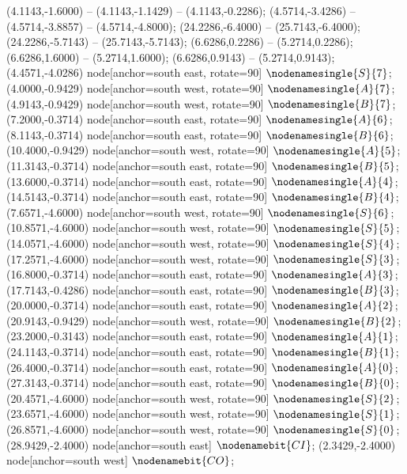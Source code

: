    (4.1143,-1.6000) -- (4.1143,-1.1429) -- (4.1143,-0.2286);
   (4.5714,-3.4286) -- (4.5714,-3.8857) -- (4.5714,-4.8000);
   (24.2286,-6.4000) -- (25.7143,-6.4000);
   (24.2286,-5.7143) -- (25.7143,-5.7143);
   (6.6286,0.2286) -- (5.2714,0.2286);
   (6.6286,1.6000) -- (5.2714,1.6000);
   (6.6286,0.9143) -- (5.2714,0.9143);
   (4.4571,-4.0286) node[anchor=south east, rotate=90] {$\nodenamesingle{S}{7}$};
   (4.0000,-0.9429) node[anchor=south west, rotate=90] {$\nodenamesingle{A}{7}$};
   (4.9143,-0.9429) node[anchor=south west, rotate=90] {$\nodenamesingle{B}{7}$};
   (7.2000,-0.3714) node[anchor=south east, rotate=90] {$\nodenamesingle{A}{6}$};
   (8.1143,-0.3714) node[anchor=south east, rotate=90] {$\nodenamesingle{B}{6}$};
   (10.4000,-0.9429) node[anchor=south west, rotate=90] {$\nodenamesingle{A}{5}$};
   (11.3143,-0.3714) node[anchor=south east, rotate=90] {$\nodenamesingle{B}{5}$};
   (13.6000,-0.3714) node[anchor=south east, rotate=90] {$\nodenamesingle{A}{4}$};
   (14.5143,-0.3714) node[anchor=south east, rotate=90] {$\nodenamesingle{B}{4}$};
   (7.6571,-4.6000) node[anchor=south west, rotate=90] {$\nodenamesingle{S}{6}$};
   (10.8571,-4.6000) node[anchor=south west, rotate=90] {$\nodenamesingle{S}{5}$};
   (14.0571,-4.6000) node[anchor=south west, rotate=90] {$\nodenamesingle{S}{4}$};
   (17.2571,-4.6000) node[anchor=south west, rotate=90] {$\nodenamesingle{S}{3}$};
   (16.8000,-0.3714) node[anchor=south east, rotate=90] {$\nodenamesingle{A}{3}$};
   (17.7143,-0.4286) node[anchor=south east, rotate=90] {$\nodenamesingle{B}{3}$};
   (20.0000,-0.3714) node[anchor=south east, rotate=90] {$\nodenamesingle{A}{2}$};
   (20.9143,-0.9429) node[anchor=south west, rotate=90] {$\nodenamesingle{B}{2}$};
   (23.2000,-0.3143) node[anchor=south east, rotate=90] {$\nodenamesingle{A}{1}$};
   (24.1143,-0.3714) node[anchor=south east, rotate=90] {$\nodenamesingle{B}{1}$};
   (26.4000,-0.3714) node[anchor=south east, rotate=90] {$\nodenamesingle{A}{0}$};
   (27.3143,-0.3714) node[anchor=south east, rotate=90] {$\nodenamesingle{B}{0}$};
   (20.4571,-4.6000) node[anchor=south west, rotate=90] {$\nodenamesingle{S}{2}$};
   (23.6571,-4.6000) node[anchor=south west, rotate=90] {$\nodenamesingle{S}{1}$};
   (26.8571,-4.6000) node[anchor=south west, rotate=90] {$\nodenamesingle{S}{0}$};
   (28.9429,-2.4000) node[anchor=south east] {$\nodenamebit{CI}$};
   (2.3429,-2.4000) node[anchor=south west] {$\nodenamebit{CO}$};
